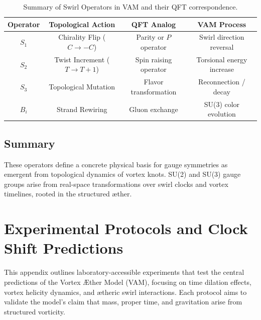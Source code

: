 \documentclass[preprint]{revtex4-2}
\begin{document}
            \begin{table}[H]
                \centering
                \footnotesize
                \begin{tabular}{|c|c|c|c|}
                    \hline
                    \textbf{Operator} & \textbf{Topological Action} & \textbf{QFT Analog} & \textbf{VAM Process} \\
                    \hline
                    $S_1$ & Chirality Flip ($C \to -C$) & Parity or $P$ operator & Swirl direction reversal \\
                    $S_2$ & Twist Increment ($T \to T+1$) & Spin raising operator & Torsional energy increase \\
                    $S_3$ & Topological Mutation & Flavor transformation & Reconnection / decay \\
                    $B_i$ & Strand Rewiring & Gluon exchange & SU(3) color evolution \\
                    \hline
                \end{tabular}
                \caption{Summary of Swirl Operators in VAM and their QFT correspondence.}
            \end{table}
        
            \subsection*{Summary}
        
            These operators define a concrete physical basis for gauge symmetries as emergent from topological dynamics of vortex knots. SU(2) and SU(3) gauge groups arise from real-space transformations over swirl clocks and vortex timelines, rooted in the structured æther.

        \section{Experimental Protocols and Clock Shift Predictions}\label{sec:experimental_protocols}
            This appendix outlines laboratory-accessible experiments that test the central predictions of the Vortex \AE{}ther Model (VAM), focusing on time dilation effects, vortex helicity dynamics, and ætheric swirl interactions. Each protocol aims to validate the model’s claim that mass, proper time, and gravitation arise from structured vorticity.
        
\end{document}
